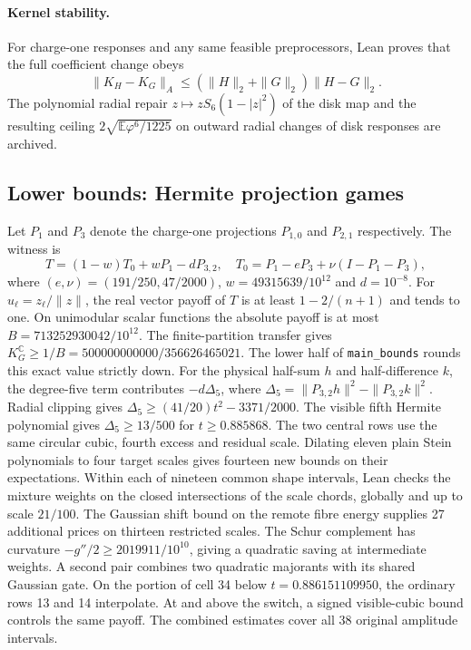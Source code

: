 \documentclass[11pt,a4paper]{article}
\newcommand{\C}{\mathbb{C}}
\newcommand{\E}{\mathbb{E}}
\newcommand{\KG}{K_G^{\C}}
\newcommand{\lean}[1]{\texttt{\small #1}}
\begin{document}
\paragraph{Kernel stability.}
For charge-one responses and any same feasible preprocessors, Lean proves that
the full coefficient change obeys
\[
 \|K_H-K_G\|_A\le(\|H\|_2+\|G\|_2)\|H-G\|_2.
\]
The polynomial radial repair $z\mapsto zS_6(1-|z|^2)$ of the disk map and the
resulting ceiling $2\sqrt{\E\varphi^6/1225}$ on outward radial changes of disk
responses are archived.

\subsection{Lower bounds: Hermite projection games}
Let $P_1$ and $P_3$ denote the charge-one projections $P_{1,0}$ and $P_{2,1}$ respectively. The witness is
\[
 T=(1-w)T_0+wP_1-dP_{3,2},\quad T_0=P_1-eP_3+\nu(I-P_1-P_3),
\]
where $(e,\nu)=(191/250,47/2000)$, $w=49315639/10^{12}$ and $d=10^{-8}$.
For $u_\ell=z_\ell/\|z\|$, the real vector payoff of $T$ is at least $1-2/(n+1)$ and tends to one.
On unimodular scalar functions the absolute payoff is at most $B=713252930042/10^{12}$.
The finite-partition transfer gives $\KG\ge1/B=500000000000/356626465021$.
The lower half of \lean{main\_bounds} rounds this exact value strictly down.
For the physical half-sum $h$ and half-difference $k$, the degree-five term contributes
$-d\Delta_5$, where $\Delta_5=\|P_{3,2}h\|^2-\|P_{3,2}k\|^2$.
Radial clipping gives $\Delta_5\ge(41/20)t^2-3371/2000$.
The visible fifth Hermite polynomial gives $\Delta_5\ge13/500$ for $t\ge0.885868$.
The two central rows use the same circular cubic, fourth excess and residual scale.
Dilating eleven plain Stein polynomials to four target scales gives fourteen new
bounds on their expectations. Within each of nineteen common shape intervals, Lean
checks the mixture weights on the closed intersections of the scale chords, globally and up to scale $21/100$.
The Gaussian shift bound on the remote fibre energy supplies 27 additional prices on thirteen restricted scales.
The Schur complement has curvature $-g''/2\ge2019911/10^{10}$, giving a quadratic saving at
intermediate weights. A second pair combines two quadratic majorants with its shared Gaussian gate.
On the portion of cell 34 below $t=0.886151109950$, the ordinary rows 13 and 14 interpolate.
At and above the switch, a signed visible-cubic bound controls the same payoff. The combined estimates cover all 38 original amplitude intervals.
\end{document}
